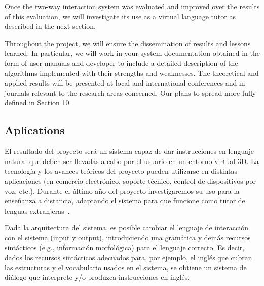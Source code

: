 Once the two-way interaction system was evaluated and improved over the results
of this evaluation, we will investigate its use as a virtual language tutor as
described in the next section.


Throughout the project, we will ensure the dissemination of results and lessons
learned. In particular, we will work in your system documentation obtained in
the form of user manuals and developer to include a detailed description of the
algorithms implemented with their strengths and weaknesses. The theoretical and
applied results will be presented at local and international conferences and in
journals relevant to the research areas concerned. Our plans to spread more
fully defined in Section 10. 


\subsection{Aplications}

El resultado del proyecto ser\'a un sistema capaz de dar instrucciones
en lenguaje natural que deben ser llevadas a cabo por el usuario en un
entorno virtual 3D.  La tecnolog\'ia y los avances te\'oricos del proyecto
pueden utilizarse en distintas aplicaciones (en comercio electr\'onico,
soporte t\'ecnico, control de dispositivos por voz, etc.).  Durante el
\'ultimo a\~no del proyecto investigaremos su uso para la ense\~nanza a
distancia, adaptando el sistema para que funcione como tutor de lenguas
extranjeras~\cite{Eskenazi09,Wik09}.

Dada la arquitectura del sistema, es posible cambiar el lenguaje de
interacci\'on con el sistema (input y output), introduciendo
una gram\'atica y dem\'as recursos sint\'acticos (e.g., informaci\'on
morfol\'ogica) para el lenguaje correcto.  Es decir, dados los recursos
sint\'acticos adecuados para, por ejemplo, el ingl\'es que cubran las
estructuras y el vocabulario usados en el sistema, se obtiene un sistema
de di\'alogo que interprete y/o produzca instrucciones en ingl\'es.

